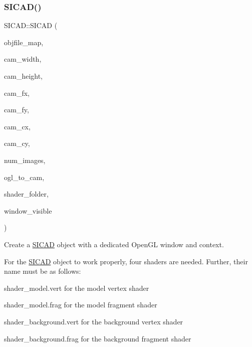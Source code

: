 \subsubsection{\texorpdfstring{S\+I\+C\+A\+D()}{SICAD()}\hspace{0.1cm}{\footnotesize\ttfamily [9/9]}}
{\footnotesize\ttfamily S\+I\+C\+A\+D\+::\+S\+I\+C\+AD (\begin{DoxyParamCaption}\item[{const \mbox{\hyperlink{classSICAD_a9e1e1460d4c0f331b4fd015aae4dd721}{Model\+Path\+Container}} \&}]{objfile\+\_\+map,  }\item[{const G\+Lsizei}]{cam\+\_\+width,  }\item[{const G\+Lsizei}]{cam\+\_\+height,  }\item[{const G\+Lfloat}]{cam\+\_\+fx,  }\item[{const G\+Lfloat}]{cam\+\_\+fy,  }\item[{const G\+Lfloat}]{cam\+\_\+cx,  }\item[{const G\+Lfloat}]{cam\+\_\+cy,  }\item[{const G\+Lint}]{num\+\_\+images,  }\item[{const std\+::vector$<$ float $>$ \&}]{ogl\+\_\+to\+\_\+cam,  }\item[{const std\+::string \&}]{shader\+\_\+folder,  }\item[{const bool}]{window\+\_\+visible }\end{DoxyParamCaption})}



Create a \mbox{\hyperlink{classSICAD}{S\+I\+C\+AD}} object with a dedicated Open\+GL window and context. 

For the \mbox{\hyperlink{classSICAD}{S\+I\+C\+AD}} object to work properly, four shaders are needed. Further, their name must be as follows\+:


\begin{DoxyItemize}
\item shader\+\_\+model.\+vert for the model vertex shader
\item shader\+\_\+model.\+frag for the model fragment shader
\item shader\+\_\+background.\+vert for the background vertex shader
\item shader\+\_\+background.\+frag for the background fragment shader
\end{DoxyItemize}


